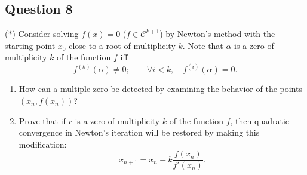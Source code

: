 \documentclass[a4paper]{article}
\begin{document}
\subsection*{Question 8}
($*$) Consider solving $f(x) = 0$ ($f \in \mathcal{C}^{k+1}$) by Newton's method with the starting point $x_0$ close to a root of multiplicity $k$. Note that $\alpha$ is a zero of multiplicity $k$ of the function $f$ iff
\[
f^{(k)}(\alpha) \neq 0; \qquad \forall i < k, \quad f^{(i)}(\alpha) = 0.
\]
\begin{enumerate}[label=(\alph*)]
    \item How can a multiple zero be detected by examining the behavior of the points $(x_n, f(x_n))$?
    \item Prove that if $r$ is a zero of multiplicity $k$ of the function $f$, then quadratic convergence in Newton's iteration will be restored by making this modification:
    \[
    x_{n+1} = x_n - k \frac{f(x_n)}{f'(x_n)}.
    \]
\end{enumerate}
\end{document}
